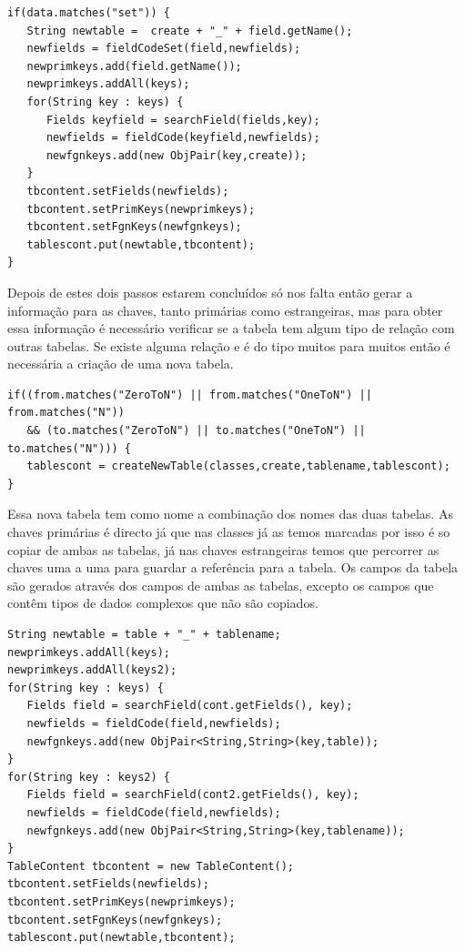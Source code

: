 \documentclass[a4paper]{article}
\begin{document}
\begin{small}
\begin{lstlisting}
if(data.matches("set")) {
   String newtable =  create + "_" + field.getName();
   newfields = fieldCodeSet(field,newfields);
   newprimkeys.add(field.getName());
   newprimkeys.addAll(keys);
   for(String key : keys) {
      Fields keyfield = searchField(fields,key);
      newfields = fieldCode(keyfield,newfields);
      newfgnkeys.add(new ObjPair(key,create));
   }
   tbcontent.setFields(newfields);
   tbcontent.setPrimKeys(newprimkeys);
   tbcontent.setFgnKeys(newfgnkeys);
   tablescont.put(newtable,tbcontent);
}
\end{lstlisting}
\end{small}

\hspace{1cm}Depois de estes dois passos estarem concluídos só nos falta então gerar a informação para as chaves, tanto primárias como estrangeiras, mas para obter essa informação é necessário verificar se a tabela tem algum tipo de relação com outras tabelas. Se existe alguma relação e é do tipo muitos para muitos então é necessária a criação de uma nova tabela.\\

\begin{small}
\begin{lstlisting}
if((from.matches("ZeroToN") || from.matches("OneToN") || from.matches("N"))
   && (to.matches("ZeroToN") || to.matches("OneToN") || to.matches("N"))) {
   tablescont = createNewTable(classes,create,tablename,tablescont);
}
\end{lstlisting}
\end{small}

\hspace{1cm}Essa nova tabela tem como nome a combinação dos nomes das duas tabelas. As chaves primárias é directo já que nas classes já as temos marcadas por isso é so copiar de ambas as tabelas, já nas chaves estrangeiras temos que percorrer as chaves uma a uma para guardar a referência para a tabela. Os campos da tabela são gerados através dos campos de ambas as tabelas, excepto os campos que contêm tipos de dados complexos que não são copiados.\\

\begin{small}
\begin{lstlisting}
String newtable = table + "_" + tablename;
newprimkeys.addAll(keys);
newprimkeys.addAll(keys2);
for(String key : keys) {
   Fields field = searchField(cont.getFields(), key);
   newfields = fieldCode(field,newfields);
   newfgnkeys.add(new ObjPair<String,String>(key,table));
}
for(String key : keys2) {
   Fields field = searchField(cont2.getFields(), key);
   newfields = fieldCode(field,newfields);
   newfgnkeys.add(new ObjPair<String,String>(key,tablename));
}
TableContent tbcontent = new TableContent();
tbcontent.setFields(newfields);
tbcontent.setPrimKeys(newprimkeys);
tbcontent.setFgnKeys(newfgnkeys);
tablescont.put(newtable,tbcontent);
\end{lstlisting}
\end{small}
\end{document}
